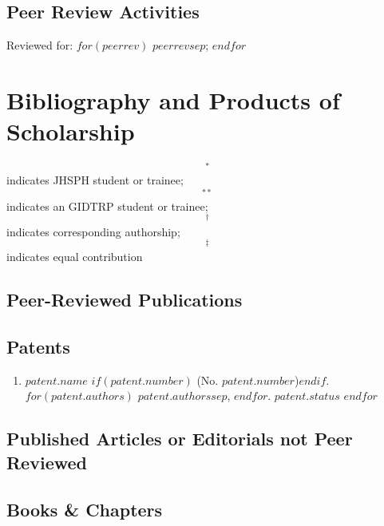 \documentclass[martgin, line]{article}
\begin{document}
\subsection*{Peer Review Activities}
Reviewed for:
$for(peerrev)$
$peerrev$$sep$;
$endfor$


\section*{Bibliography and Products of Scholarship}

\begin{footnotesize}$$^*$$ indicates JHSPH student or trainee;
    $$^{**}$$ indicates an GIDTRP student or trainee;
    $$^\dagger$$ indicates corresponding authorship;
    $$^\ddagger$$ indicates equal contribution
  \end{footnotesize}

\subsection*{Peer-Reviewed Publications}

\begin{enumerate}
  
\end{enumerate}


\subsection*{Patents}
\begin{enumerate}
  $for(patent)$
  \item
  $patent.name$
  $if(patent.number)$ (No. $patent.number$)$endif$.
  $for(patent.authors)$
  $patent.authors$$sep$,
  $endfor$.
  \textit{$patent.status$}
  $endfor$
\end{enumerate}


\subsection*{Published Articles or Editorials not Peer Reviewed}

\begin{enumerate}
  
\end{enumerate}


\subsection*{Books \& Chapters}

\begin{enumerate}
  
\end{enumerate}
\end{document}
